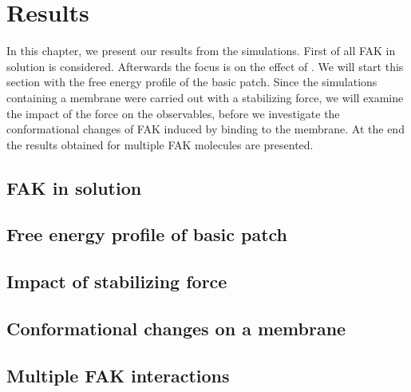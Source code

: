 \chapter{Results}
In this chapter, we present our results from the simulations. First of all FAK in solution is considered. Afterwards the focus is on the effect of \pip{}. We will start this section with the free energy profile of the basic patch. Since the simulations containing a membrane were carried out with a stabilizing force, we will examine the impact of the force on the observables, before we investigate the conformational changes of FAK induced by binding to the membrane. At the end the results obtained for multiple FAK molecules are presented.
%
%
\section{FAK in solution}

%
%
\section{Free energy profile of basic patch}

%
%
\section{Impact of stabilizing force}

%
%
\section{Conformational changes on a membrane}

%
%
\section{Multiple FAK interactions}
